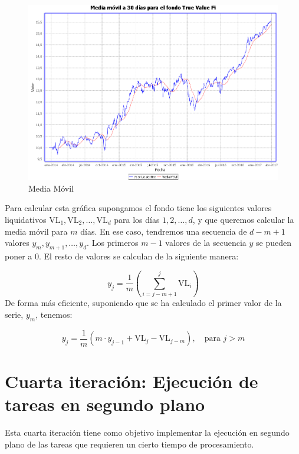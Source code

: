 \documentclass[12pt, a4paper]{article}
\begin{document}
	\begin{figure}[htbp]
	\centering
	\includegraphics[width=\textwidth]{figuras/media.PNG}
	\caption{Media Móvil}
	\label{fig:media}
	\end {figure}
	
	Para calcular esta gráfica supongamos el fondo tiene los siguientes valores liquidativos $\text{VL}_1,\text{VL}_2,\ldots,\text{VL}_d$ para los días $1,2,\ldots,d$, y que queremos calcular la media móvil para $m$ días. En ese caso, tendremos una secuencia de $d-m+1$ valores $y_m,y_{m+1},\ldots,y_d$. Los primeros $m-1$ valores de la secuencia $y$ se pueden poner a $0$. El resto de valores se calculan de la siguiente manera:
	
	\begin{equation}
	y_j=\frac{1}{m}\left(\sum_{i=j-m+1}^{j}\text{VL}_i\right)
	\end{equation}
	De forma más eficiente, suponiendo que se ha calculado el primer valor de la serie, $y_m$, tenemos:
	
	\begin{equation}
	y_{j}=\frac{1}{m}\left(m\cdot y_{j-1}+\text{VL}_j-\text{VL}_{j-m}\right),\quad\text{para }j>m
	\end{equation}

\newpage

\section{Cuarta iteración: Ejecución de tareas en segundo plano}

Esta cuarta iteración tiene como objetivo implementar la ejecución en segundo plano de las tareas que requieren un cierto tiempo de procesamiento.\\
\end{document}
